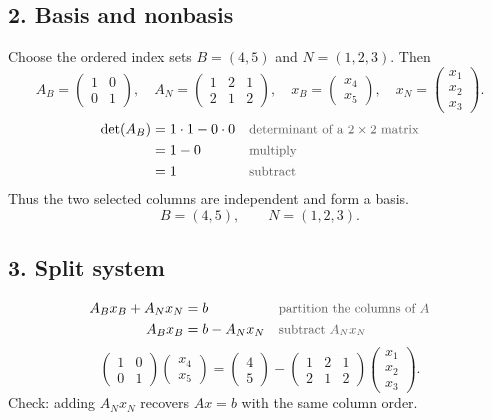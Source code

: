 \documentclass[a4paper,11pt]{article}
\newif\ifexplain
\newcommand{\teil}[1]{\subsection*{#1}}
\newcommand{\why}[1]{\text{\small\color{black!65}#1}}
\newcommand{\explain}[1]{\ifexplain\begin{erklbox}#1\end{erklbox}\fi}
\begin{document}
\teil{2. Basis and nonbasis}
Choose the ordered index sets $B=(4,5)$ and $N=(1,2,3)$. Then
\[
A_B=\begin{pmatrix}1&0\\0&1\end{pmatrix},\quad
A_N=\begin{pmatrix}1&2&1\\2&1&2\end{pmatrix},\quad
x_B=\begin{pmatrix}x_4\\x_5\end{pmatrix},\quad x_N=\begin{pmatrix}x_1\\x_2\\x_3\end{pmatrix}.
\]
\begin{align*}
\det(A_B)&=1\cdot1-0\cdot0&&\why{determinant of a $2\times2$ matrix}\\
&=1-0&&\why{multiply}\\
&=1&&\why{subtract}
\end{align*}
Thus the two selected columns are independent and form a basis.
\[\boxed{B=(4,5),\qquad N=(1,2,3).}\]
\explain{Wir brauchen zwei unabhängige Spalten, weil das System zwei Gleichungen hat. Die Spalten zu $x_4$ und $x_5$ bilden schon die Einheitsmatrix. Damit müssen wir keine weitere Matrix invertieren. Die Reihenfolge behalten wir bei, damit die Einträge von $x_B$ zu den richtigen Spalten gehören. Eine andere Spaltenwahl wäre ebenfalls erlaubt, solange die ausgewählte Teilmatrix invertierbar ist, aber für diese Aufgabe bringt sie keinen Vorteil und macht das Auflösen des Systems nur unnötig länger als nötig.}

\teil{3. Split system}
\begin{align*}
A_Bx_B+A_Nx_N&=b&&\why{partition the columns of $A$}\\
A_Bx_B&=b-A_Nx_N&&\why{subtract $A_Nx_N$}
\end{align*}
\[
\boxed{\begin{pmatrix}1&0\\0&1\end{pmatrix}\begin{pmatrix}x_4\\x_5\end{pmatrix}
=\begin{pmatrix}4\\5\end{pmatrix}-\begin{pmatrix}1&2&1\\2&1&2\end{pmatrix}\begin{pmatrix}x_1\\x_2\\x_3\end{pmatrix}.}
\]
Check: adding $A_Nx_N$ recovers $Ax=b$ with the same column order.
\explain{Hier werden nur die Nichtbasis-Terme nach rechts gebracht. Das Minus gilt für das gesamte Matrixprodukt, nicht bloß für die erste Spalte. Der Inhalt des Gleichungssystems bleibt gleich.}
\end{document}
